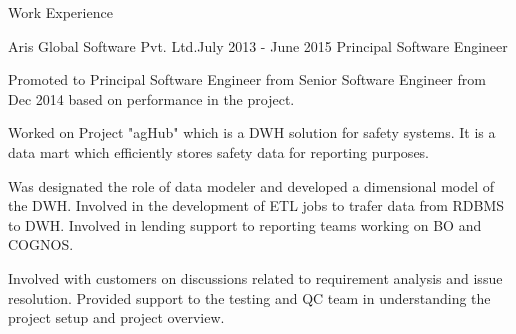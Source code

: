 \documentclass{resume} %
\begin{document}
\begin{rSection}{Work Experience}




\begin{rSubsection}{Aris Global Software Pvt. Ltd.}{July 2013 - June 2015}
{Principal Software Engineer}{}
\item Promoted to Principal Software Engineer from Senior Software Engineer from Dec 2014 based on performance in the project.
\item Worked on Project "agHub" which is a DWH solution for safety systems. It is a data mart which efficiently stores safety data for reporting purposes.
\item Was designated the role of data modeler and developed a dimensional model of the DWH. Involved in the development of ETL jobs to trafer data from RDBMS to DWH. Involved in lending support to reporting teams working on BO and COGNOS.
\item Involved with customers on discussions related to requirement analysis and issue resolution. Provided support to the testing and QC team in understanding the project setup and project overview.

\end{rSubsection}



\end{rSection}
\end{document}

